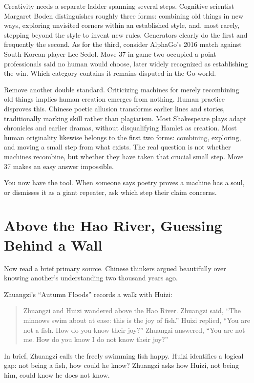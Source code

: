 Creativity needs a separate ladder spanning several steps. Cognitive scientist Margaret Boden distinguishes roughly three forms: combining old things in new ways, exploring unvisited corners within an established style, and, most rarely, stepping beyond the style to invent new rules. Generators clearly do the first and frequently the second. As for the third, consider AlphaGo's 2016 match against South Korean player Lee Sedol. Move 37 in game two occupied a point professionals said no human would choose, later widely recognized as establishing the win. Which category contains it remains disputed in the Go world.

Remove another double standard. Criticizing machines for merely recombining old things implies human creation emerges from nothing. Human practice disproves this. Chinese poetic allusion transforms earlier lines and stories, traditionally marking skill rather than plagiarism. Most Shakespeare plays adapt chronicles and earlier dramas, without disqualifying Hamlet as creation. Most human originality likewise belongs to the first two forms: combining, exploring, and moving a small step from what exists. The real question is not whether machines recombine, but whether they have taken that crucial small step. Move 37 makes an easy answer impossible.

You now have the tool. When someone says poetry proves a machine has a soul, or dismisses it as a giant repeater, ask which step their claim concerns.

\section{Above the Hao River, Guessing Behind a Wall}
Now read a brief primary source. Chinese thinkers argued beautifully over knowing another's understanding two thousand years ago.

Zhuangzi's ``Autumn Floods'' records a walk with Huizi:

\begin{quote}
Zhuangzi and Huizi wandered above the Hao River. Zhuangzi said, ``The minnows swim about at ease: this is the joy of fish.'' Huizi replied, ``You are not a fish. How do you know their joy?'' Zhuangzi answered, ``You are not me. How do you know I do not know their joy?''
\end{quote}
In brief, Zhuangzi calls the freely swimming fish happy. Huizi identifies a logical gap: not being a fish, how could he know? Zhuangzi asks how Huizi, not being him, could know he does not know.

